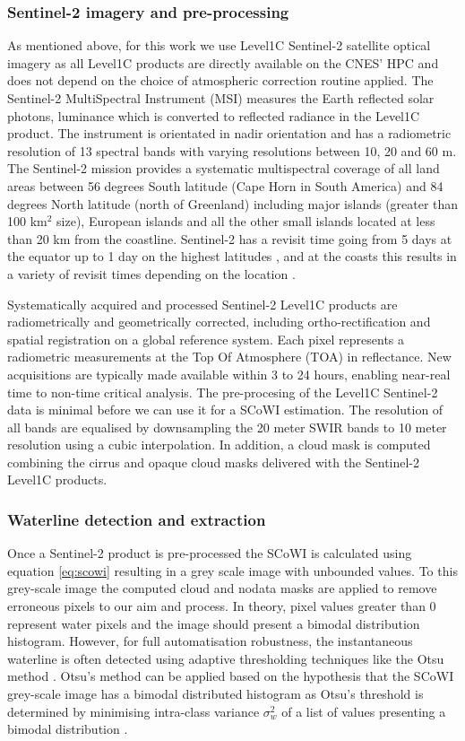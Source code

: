 \documentclass[remotesensing,article,submit,pdftex,moreauthors]{Definitions/mdpi}
\begin{document}
\subsubsection{Sentinel-2 imagery and pre-processing}
As mentioned above, for this work we use Level1C Sentinel-2 satellite optical imagery as all Level1C products are directly available on the CNES' HPC and does not depend on the choice of atmospheric correction routine applied. The Sentinel-2 MultiSpectral Instrument (MSI) measures the Earth reflected solar photons, luminance which is converted to reflected radiance in the Level1C product. The instrument is orientated in nadir orientation and has a radiometric resolution of 13 spectral bands with varying resolutions between 10, 20 and 60 m. The Sentinel-2 mission provides a systematic multispectral coverage of all land areas between 56 degrees South latitude (Cape Horn in South America) and 84 degrees North latitude (north of Greenland) including major islands (greater than 100 km$^2$ size), European islands and all the other small islands located at less than 20 km from the coastline. Sentinel-2 has a revisit time going from 5 days at the equator up to 1 day on the highest latitudes \citep{ESAreq}, and at the coasts this results in a variety of revisit times depending on the location \citep{BERGSMA2020}.

Systematically acquired and processed Sentinel-2 Level1C products are radiometrically and geometrically corrected, including ortho-rectification and spatial registration on a global reference system. Each pixel represents a radiometric measurements at the Top Of Atmosphere (TOA) in reflectance. New acquisitions are typically made available within 3 to 24 hours, enabling near-real time to non-time critical analysis. The pre-procesing of the Level1C Sentinel-2 data is minimal before we can use it for a SCoWI estimation. The resolution of all bands are equalised by downsampling the 20 meter SWIR bands to 10 meter resolution using a cubic interpolation. In addition, a cloud mask is computed combining the cirrus and opaque cloud masks delivered with the Sentinel-2 Level1C products.

\subsubsection{Waterline detection and extraction}
Once a Sentinel-2 product is pre-processed the SCoWI is calculated using equation \ref{eq:scowi} resulting in a grey scale image with unbounded values. To this grey-scale image the computed cloud and nodata masks are applied to remove erroneous pixels to our aim and process. In theory, pixel values greater than 0 represent water pixels and the image should present a bimodal distribution histogram. However, for full automatisation robustness, the instantaneous waterline is often detected using adaptive thresholding techniques like the Otsu method \citep{Bishop_sub_pixel, VOS2019_sub}. Otsu's method can be applied based on the hypothesis that the SCoWI grey-scale image has a bimodal distributed histogram as Otsu's threshold is determined by minimising intra-class variance $\sigma_w^2$ of a list of values presenting a bimodal distribution \citep{OTSU1979}.
\end{document}
